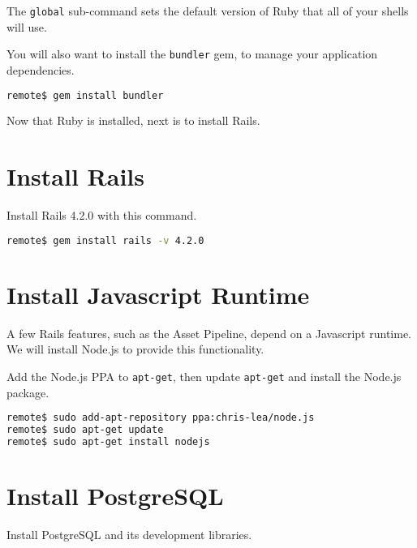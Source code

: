 The \texttt{global} sub-command sets the default version of Ruby
that all of your shells will use.

You will also want to install the \texttt{bundler} gem,
to manage your application dependencies.

\begin{minipage}{\linewidth}
\begin{lstlisting}[language=bash]
remote$ gem install bundler
\end{lstlisting}
\end{minipage}

Now that Ruby is installed, next is to install Rails.

\section{Install Rails}

Install Rails 4.2.0 with this command.

\begin{minipage}{\linewidth}
\begin{lstlisting}[language=bash]
remote$ gem install rails -v 4.2.0
\end{lstlisting}
\end{minipage}

\section{Install Javascript Runtime}

A few Rails features, such as the Asset Pipeline,
depend on a Javascript runtime. We will install Node.js
to provide this functionality.

Add the Node.js PPA to \texttt{apt-get}, then update \texttt{apt-get}
and install the Node.js package.

\begin{minipage}{\linewidth}
\begin{lstlisting}[language=bash]
remote$ sudo add-apt-repository ppa:chris-lea/node.js
remote$ sudo apt-get update
remote$ sudo apt-get install nodejs
\end{lstlisting}
\end{minipage}

\section{Install PostgreSQL}

Install PostgreSQL and its development libraries.

